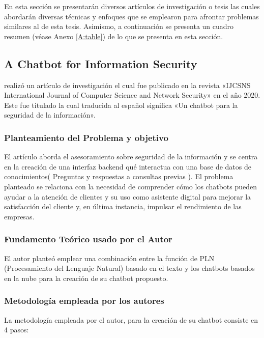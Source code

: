 En esta sección se presentarán diversos artículos de investigación o tesis las cuales abordarán diversas técnicas y enfoques que se emplearon para afrontar problemas similares al de esta tesis. Asimismo, a continuación se presenta un cuadro resumen (véase Anexo \ref{A:table}) de lo que se presenta en esta sección.


\subsection{A Chatbot for Information Security  \citep*{pr_A_Chatbot_for_Information_Security}}

\citeauthor{pr_A_Chatbot_for_Information_Security} realizó un artículo de investigación el cual fue publicado en la revista «IJCSNS International Journal of Computer Science and Network Security» en el año 2020. 
Este fue titulado  la cual traducida al español significa «Un chatbot para la seguridad de la información».

\subsubsection{Planteamiento del Problema y objetivo }
El artículo aborda el asesoramiento sobre seguridad de la información y se centra en la creación de una interfaz backend qué interactua con una base de datos de conocimientos( Preguntas y respuestas a consultas previas ). El problema planteado se relaciona con la necesidad de comprender cómo los chatbots pueden ayudar a la atención de clientes y su uso como asistente digital para mejorar la satisfacción del cliente y, en última instancia, impulsar el rendimiento de las empresas.

\subsubsection{Fundamento Teórico usado por el Autor}
El autor planteó emplear una combinación entre la función de PLN (Procesamiento del Lenguaje Natural) basado en el texto y los chatbots basados en la nube para la creación de su chatbot propuesto.

\subsubsection{Metodología empleada por los autores}
La metodología empleada por el autor, para la creación de su chatbot consiste en 4 pasos: 

